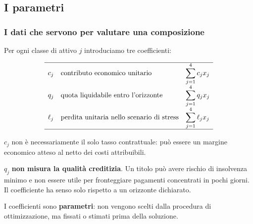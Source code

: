 

\subsection{I parametri}%

\begin{frame}%
%

\frametitle{I dati che servono per valutare una composizione}%
%

%


Per ogni classe di attivo $j$ introduciamo tre coefficienti:

{\small
\[%
\begin{array}
[c]{lll}\hline
c_{j} & \mbox{contributo economico unitario} & \displaystyle\sum_{j=1}%
^{4}c_{j}x_{j}\\[8pt]%
q_{j} & \mbox{quota liquidabile entro l'orizzonte} & \displaystyle\sum
_{j=1}^{4}q_{j}x_{j}\\[8pt]%
\ell_{j} & \mbox{perdita unitaria nello scenario di stress} &
\displaystyle\sum_{j=1}^{4}\ell_{j}x_{j}\\[4pt]\hline
\end{array}
\]
}

\medskip

\begin{stepitemize}
\item $c_{j}$ non \`{e} necessariamente il solo tasso contrattuale: pu\`{o}
essere un margine economico atteso al netto dei costi attribuibili.

\item $q_{j}$ \textbf{non misura la qualit\`{a} creditizia}. Un titolo pu\`{o}
avere rischio di insolvenza minimo e non essere utile per fronteggiare
pagamenti concentrati in pochi giorni. Il coefficiente ha senso solo rispetto
a un orizzonte dichiarato.

\item I coefficienti sono \textbf{parametri}: non vengono scelti dalla
procedura di ottimizzazione, ma fissati o stimati prima della soluzione.
\end{stepitemize}

%

\transboxout
\end{frame}%


